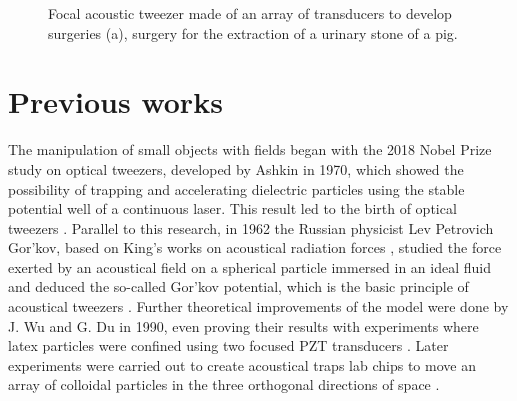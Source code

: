 \begin{figure}[t]
\begin{subfigure}{.58\columnwidth}
    \caption{}
    \label{fig:pig_surgery}
    \end{subfigure}
    \caption{Focal acoustic tweezer made of an array of transducers to develop surgeries (a), surgery for the extraction of a urinary stone of a pig.}
    \label{fig:pig}
\end{figure}
\section{Previous works}

The manipulation of small objects with fields began with the 2018 Nobel Prize study on optical tweezers, developed by Ashkin in 1970, which showed the possibility of trapping and accelerating dielectric particles using the stable potential well of a continuous laser. This result led to the birth of optical tweezers \cite{Ashkin1970}. Parallel to this research, in 1962 the Russian physicist Lev Petrovich Gor'kov, based on King's works on acoustical radiation forces \cite{King1934, King1935}, studied the force exerted by an acoustical field on a spherical particle immersed in an ideal fluid and deduced the so-called Gor'kov potential, which is the basic principle of acoustical tweezers \cite{Gorkov1962}. 
Further theoretical improvements of the model were done by J. Wu and G. Du in 1990, even proving their results with experiments where  latex particles were confined using two focused PZT transducers \cite{WuDu1990,Wu1991}. Later experiments were carried out to create acoustical traps lab chips to move an array of colloidal particles in the three orthogonal directions of space \cite{Shi2009}. 


